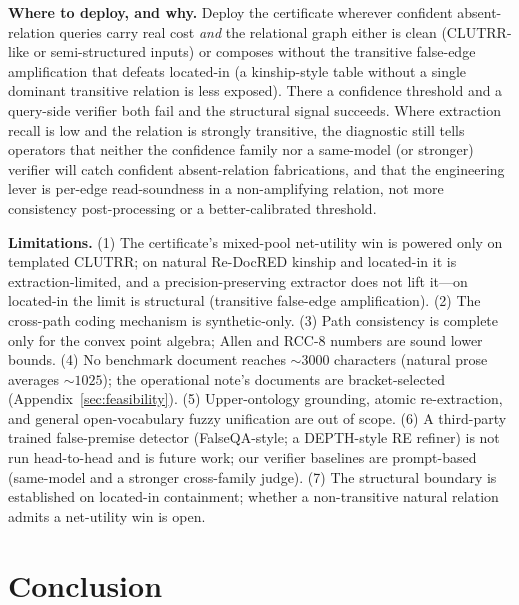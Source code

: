 \documentclass[11pt,letterpaper]{article}
\begin{document}
\textbf{Where to deploy, and why.} Deploy the certificate wherever confident absent-relation queries carry real cost \emph{and} the relational graph either is clean (CLUTRR-like or semi-structured inputs) or composes without the transitive false-edge amplification that defeats located-in (a kinship-style table without a single dominant transitive relation is less exposed). There a confidence threshold and a query-side verifier both fail and the structural signal succeeds. Where extraction recall is low and the relation is strongly transitive, the diagnostic still tells operators that neither the confidence family nor a same-model (or stronger) verifier will catch confident absent-relation fabrications, and that the engineering lever is per-edge read-soundness in a non-amplifying relation, not more consistency post-processing or a better-calibrated threshold.

\textbf{Limitations.} (1) The certificate's mixed-pool net-utility win is powered only on templated CLUTRR; on natural Re-DocRED kinship and located-in it is extraction-limited, and a precision-preserving extractor does not lift it---on located-in the limit is structural (transitive false-edge amplification). (2) The cross-path coding mechanism is synthetic-only. (3) Path consistency is complete only for the convex point algebra; Allen and RCC-8 numbers are sound lower bounds. (4) No benchmark document reaches ${\sim}3000$ characters (natural prose averages ${\sim}1025$); the operational note's documents are bracket-selected (Appendix~\ref{sec:feasibility}). (5) Upper-ontology grounding, atomic re-extraction, and general open-vocabulary fuzzy unification are out of scope. (6) A third-party trained false-premise detector (FalseQA-style; a DEPTH-style RE refiner) is not run head-to-head and is future work; our verifier baselines are prompt-based (same-model and a stronger cross-family judge). (7) The structural boundary is established on located-in containment; whether a non-transitive natural relation admits a net-utility win is open.

\section{Conclusion}
\label{sec:conclusion}
\end{document}
